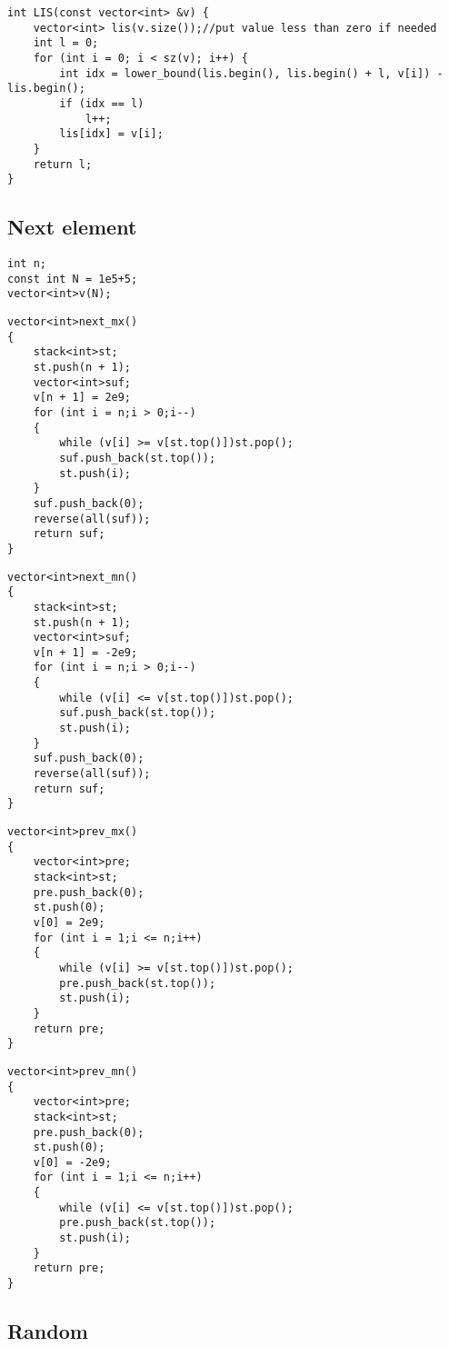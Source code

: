 {\begin{lstlisting}[style=cpp]
int LIS(const vector<int> &v) {  
    vector<int> lis(v.size());//put value less than zero if needed  
    int l = 0;  
    for (int i = 0; i < sz(v); i++) {  
        int idx = lower_bound(lis.begin(), lis.begin() + l, v[i]) - lis.begin();  
        if (idx == l)  
            l++;  
        lis[idx] = v[i];  
    }  
    return l;  
}
\end{lstlisting}

\subsection{Next element}

\begin{lstlisting}[style=cpp]
int n;
const int N = 1e5+5;
vector<int>v(N);
\end{lstlisting}

\begin{lstlisting}[style=cpp]
vector<int>next_mx()
{
	stack<int>st;
	st.push(n + 1);
	vector<int>suf;
	v[n + 1] = 2e9;
	for (int i = n;i > 0;i--)
	{
		while (v[i] >= v[st.top()])st.pop();
		suf.push_back(st.top());
		st.push(i);
	}
	suf.push_back(0);
	reverse(all(suf));
	return suf;
}
\end{lstlisting}

\begin{lstlisting}[style=cpp]
vector<int>next_mn()
{
	stack<int>st;
	st.push(n + 1);
	vector<int>suf;
	v[n + 1] = -2e9;
	for (int i = n;i > 0;i--)
	{
		while (v[i] <= v[st.top()])st.pop();
		suf.push_back(st.top());
		st.push(i);
	}
	suf.push_back(0);
	reverse(all(suf));
	return suf;
}
\end{lstlisting}

\begin{lstlisting}[style=cpp]
vector<int>prev_mx()
{
	vector<int>pre;
	stack<int>st;
	pre.push_back(0);
	st.push(0);
	v[0] = 2e9;
	for (int i = 1;i <= n;i++)
	{
		while (v[i] >= v[st.top()])st.pop();
		pre.push_back(st.top());
		st.push(i);
	}
	return pre;
}
\end{lstlisting}

\begin{lstlisting}[style=cpp]
vector<int>prev_mn()
{
	vector<int>pre;
	stack<int>st;
	pre.push_back(0);
	st.push(0);
	v[0] = -2e9;
	for (int i = 1;i <= n;i++)
	{
		while (v[i] <= v[st.top()])st.pop();
		pre.push_back(st.top());
		st.push(i);
	}
	return pre;
}
\end{lstlisting}

\subsection{Random}

}
